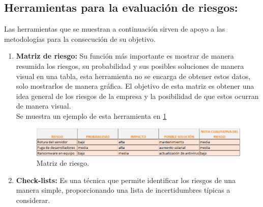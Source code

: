 \subsection{Herramientas  para la evaluación de riesgos:}
Las herramientas que se muestran a continuación sirven de apoyo a las metodologías para la consecución de su objetivo.
\begin{enumerate}

\item {\bfseries Matriz de riesgo:}
Su función más importante es mostrar de manera resumida los riesgos, su probabilidad  y sus posibles soluciones de manera visual en una tabla, esta herramienta no se encarga de obtener estos datos, solo mostrarlos de manera gráfica.
El objetivo de esta matriz es obtener una idea general de los riesgos de la empresa y la posibilidad de que estos ocurran de manera visual.\\
Se muestra un ejemplo de esta herramienta en \ref{img:matriz_riesgo}
\begin{figure}[tphb]
  		   \centering
     		   \includegraphics[width=6in]{matriz_de_riesgo.png}
  		   \caption{Matriz de riesgo.}
  		   \label{img:matriz_riesgo}
\end{figure}
\item {\bfseries Check-lists:}
Es una técnica que permite identificar los riesgos de una manera simple, proporcionando una lista de incertidumbres típicas a considerar.


\end{enumerate}
